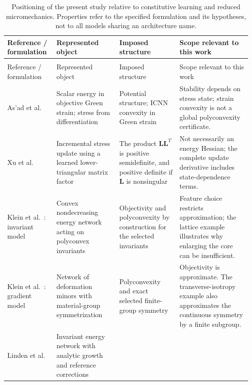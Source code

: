 \begingroup
\footnotesize
\setlength{\tabcolsep}{4pt}
\renewcommand{\arraystretch}{1.06}
\setlength{\LTcapwidth}{\linewidth}
\begin{longtable}{@{}>{\raggedright\arraybackslash}p{2.6cm}>{\raggedright\arraybackslash}p{4.05cm}>{\raggedright\arraybackslash}p{4.15cm}>{\raggedright\arraybackslash}p{4.85cm}@{}}
\caption{Positioning of the present study relative to constitutive learning and reduced micromechanics. Properties refer to the specified formulation and its hypotheses, not to all models sharing an architecture name.}
\label{tab:literature}\\
\toprule
Reference / formulation & Represented object & Imposed structure & Scope relevant to this work\\
\midrule
\endfirsthead
\multicolumn{4}{l}{Table \thetable\ continued}\\
\toprule
Reference / formulation & Represented object & Imposed structure & Scope relevant to this work\\
\midrule
\endhead
\bottomrule
\endfoot
As'ad et al.~\cite{asad2022}
& Scalar energy in objective Green strain; stress from differentiation
& Potential structure; ICNN convexity in Green strain
& Stability depends on stress state; strain convexity is not a global polyconvexity certificate.\\*
\addlinespace
Xu et al.~\cite{Xu2021}
& Incremental stress update using a learned lower-triangular matrix factor
& The product $\bm L\bm L^T$ is positive semidefinite, and positive definite if $\bm L$ is nonsingular
& Not necessarily an energy Hessian; the complete update derivative includes state-dependence terms.\\
\addlinespace
Klein et al.~\cite{klein2022}: invariant model
& Convex nondecreasing energy network acting on polyconvex invariants
& Objectivity and polyconvexity by construction for the selected invariants
& Feature choice restricts approximation; the lattice example illustrates why enlarging the core can be insufficient.\\
\addlinespace
Klein et al.~\cite{klein2022}: gradient model
& Network of deformation minors with material-group symmetrization
& Polyconvexity and exact selected finite-group symmetry
& Objectivity is approximate. The transverse-isotropy example also approximates the continuous symmetry by a finite subgroup.\\
\addlinespace
Linden et al.~\cite{linden2023}
& Invariant energy network with analytic growth and reference corrections

\end{longtable}
